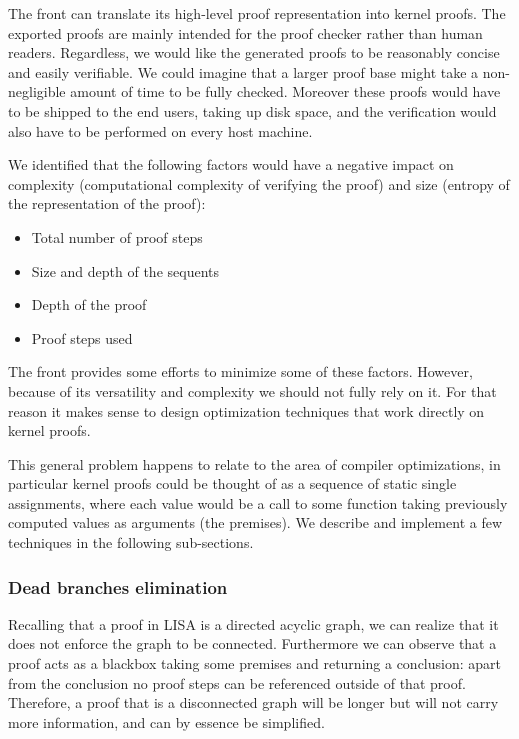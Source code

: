 The front can translate its high-level proof representation into kernel proofs. The exported proofs are mainly intended for the proof checker rather than human readers. Regardless, we would like the generated proofs to be reasonably concise and easily verifiable. We could imagine that a larger proof base might take a non-negligible amount of time to be fully checked. Moreover these proofs would have to be shipped to the end users, taking up disk space, and the verification would also have to be performed on every host machine.

We identified that the following factors would have a negative impact on complexity (computational complexity of verifying the proof) and size (entropy of the representation of the proof):

\begin{itemize}
  \item Total number of proof steps
  \item Size and depth of the sequents
  \item Depth of the proof
  \item Proof steps used
\end{itemize}

The front provides some efforts to minimize some of these factors. However, because of its versatility and complexity we should not fully rely on it. For that reason it makes sense to design optimization techniques that work directly on kernel proofs.

This general problem happens to relate to the area of compiler optimizations, in particular kernel proofs could be thought of as a sequence of static single assignments, where each value would be a call to some function taking previously computed values as arguments (the premises). We describe and implement a few techniques in the following sub-sections.

\subsubsection{Dead branches elimination}

Recalling that a proof in LISA is a directed acyclic graph, we can realize that it does not enforce the graph to be connected. Furthermore we can observe that a proof acts as a blackbox taking some premises and returning a conclusion: apart from the conclusion no proof steps can be referenced outside of that proof. Therefore, a proof that is a disconnected graph will be longer but will not carry more information, and can by essence be simplified.

